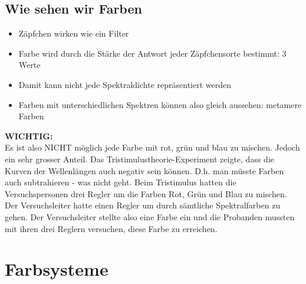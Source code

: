   
\subsection{Wie sehen wir Farben}
\begin{itemize}
    \item Zäpfchen wirken wie ein Filter
    \item Farbe wird durch die Stärke der Antwort jeder Zäpfchensorte bestimmt: 3 Werte
    \item Damit kann nicht jede Spektraldichte repräsentiert werden
    \item Farben mit unterschiedlichen Spektren können also gleich aussehen: metamere Farben
\end{itemize}
\noindent
\textbf{WICHTIG:}\\Es ist also NICHT möglich jede Farbe mit rot, grün und blau zu mischen. Jedoch ein sehr grosser Anteil.
Das Tristimulustheorie-Experiment zeigte, dass die Kurven der Wellenlängen auch negativ sein können. D.h. man müsste Farben auch subtrahieren - was nicht geht. Beim Tristimulus hatten die Versuchspersonen drei Regler um die Farben Rot, Grün und Blau zu mischen. Der Versuchsleiter hatte einen Regler um durch sämtliche Spektralfarben zu gehen. Der Versuchsleiter stellte also eine Farbe ein und die Probanden mussten mit ihren drei Reglern versuchen, diese Farbe zu erreichen.

\clearpage
\section{Farbsysteme}
